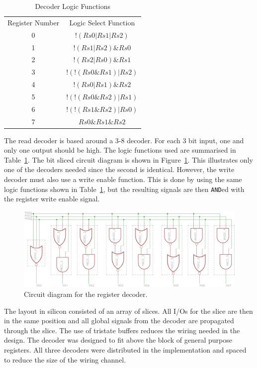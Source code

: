 \begin{table}
\caption{Decoder Logic Functions}
\label{tab:reg:decoder}
\centering
\begin{tabular}{cc}
Register Number & Logic Select Function \\
0		&		$!( Rs0 | Rs1 | Rs2 )$ \\
1		&		$ !( Rs1 | Rs2 ) \& Rs0$	\\
2		&		$!( Rs2 | Rs0 ) \& Rs1$\\
3		&		$! ( ! ( Rs0 \& Rs1 ) | Rs2 )$	\\
4		&		$!( Rs0 | Rs1 ) \& Rs2$	\\
5		&		$! ( ! ( Rs0 \& Rs2 ) | Rs1 )$	\\
6		&		$! ( ! ( Rs1 \& Rs2 ) | Rs0 )$	\\
7		&		$Rs0 \& Rs1 \& Rs2$	\\
\end{tabular}

\end{table}

The read decoder is based around a 3-8 decoder. 
For each 3 bit input, one and only one output should be high. 
The logic functions used are summarised in Table~\ref{tab:reg:decoder}.
The bit sliced circuit diagram is shown in Figure~\ref{fig:reg:decoder}.
This illustrates only one of the decoders needed since the second is identical.
However, the write decoder must also use a write enable function.
This is done by using the same logic functions shown in Table~\ref{tab:reg:decoder}, but the resulting signals are then \texttt{AND}ed with the register write enable signal. 

\begin{figure}
\centering
\includegraphics[width=\textwidth]{../../eagle/regBlock/regBlock_decoder.png}
\caption{Circuit diagram for the register decoder.}
\label{fig:reg:decoder}
\end{figure}

The layout in silicon consisted of an array of slices. 
All I/Os for the slice are then in the same position and all global signals from the decoder are propagated through the slice.
The use of tristate buffers reduces the wiring needed in the design. 
The decoder was designed to fit above the block of general purpose registers. 
All three decoders were distributed in the implementation and spaced to reduce the size of the wiring channel.
